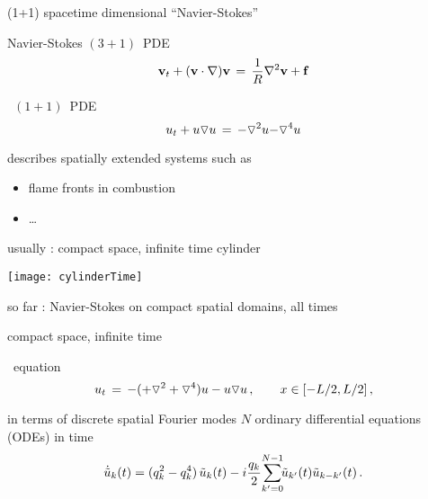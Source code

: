 \begin{frame}{(1+1) spacetime dimensional ``Navier-Stokes''}

\begin{block}{Navier-Stokes $(3+1)$\dmn\ PDE} %
\[
\bv_t + (\bv \cdot \nabla) \bv
	\,=\,
\frac{1}{R} \nabla ^2 \bv
+ \mathbf{f}
\]
\end{block}

\bigskip

\begin{block}{\KS\ $(1+1)$\dmn\ PDE}
\[
  u_t + u \triangledown u \,=\,
    {\color{red}-}\triangledown^2 u {\color{red}-\triangledown^4 u}
\]
\end{block}

\bigskip\bigskip

describes spatially extended systems such as
\begin{itemize}
 \item flame fronts in combustion
 \item \ldots
\end{itemize}
\end{frame}

\begin{frame}{usually : compact space, infinite time cylinder}
\begin{center}
\texttt{[image: cylinderTime]}
\end{center}
so far : Navier-Stokes on compact spatial domains, all times
\end{frame}

\begin{frame}{compact space, infinite time} %
\begin{block}{\KS\ equation}
\[
  u_t \,=\,
    -({\color{red}+}\triangledown^2 +{\color{red}\triangledown^4}) u
    - u \triangledown u
    \,,\qquad   x \in [-L/2,L/2]
    \,,
\]
\end{block}

\bigskip

\begin{block}{in terms of discrete spatial Fourier modes}
$N$ ordinary differential equations (ODEs) in time
\[
\dot{\Fu}_k(\zeit) = ( q_k^2 - q_k^4 )\, \Fu_k(\zeit)
- i \frac{q_k}{2} \!\sum_{k'=0}^{N-1} \!\!\Fu_{k'}(\zeit) \Fu_{k-k'}(\zeit)
\,.
\]
\end{block}
\end{frame}

